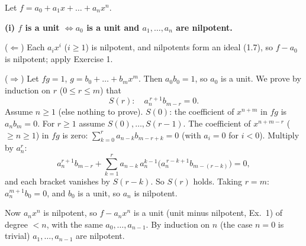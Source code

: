 \documentclass[11pt]{article}
\begin{document}
\pf
Let $f=a_0+a_1x+\dots+a_nx^n$.

\textbf{(i) $f$ is a unit $\iff a_0$ is a unit and $a_1,\dots,a_n$ are nilpotent.}

($\Leftarrow$) Each $a_ix^i$ ($i\ge1$) is nilpotent, and nilpotents form an ideal (1.7), so $f-a_0$ is nilpotent; apply Exercise 1.

($\Rightarrow$) Let $fg=1$, $g=b_0+\dots+b_mx^m$. Then $a_0b_0=1$, so $a_0$ is a unit. We prove by induction on $r$ ($0\le r\le m$) that
\[
S(r):\quad a_n^{\,r+1}b_{m-r}=0 .
\]
Assume $n\ge1$ (else nothing to prove). $S(0)$: the coefficient of $x^{n+m}$ in $fg$ is $a_nb_m=0$. For $r\ge1$ assume $S(0),\dots,S(r-1)$. The coefficient of $x^{n+m-r}$ ($\ge n\ge 1$) in $fg$ is zero:
$\sum_{k=0}^{r}a_{n-k}b_{m-r+k}=0$ (with $a_i=0$ for $i<0$). Multiply by $a_n^{r}$:
\[
a_n^{r+1}b_{m-r}+\sum_{k=1}^{r}a_{n-k}\,a_n^{k-1}\bigl(a_n^{\,r-k+1}b_{m-(r-k)}\bigr)=0,
\]
and each bracket vanishes by $S(r-k)$. So $S(r)$ holds. Taking $r=m$: $a_n^{m+1}b_0=0$, and $b_0$ is a unit, so $a_n$ is nilpotent.

Now $a_nx^n$ is nilpotent, so $f-a_nx^n$ is a unit (unit minus nilpotent, Ex.~1) of degree $<n$, with the same $a_0,\dots,a_{n-1}$. By induction on $n$ (the case $n=0$ is trivial) $a_1,\dots,a_{n-1}$ are nilpotent.
\end{document}
